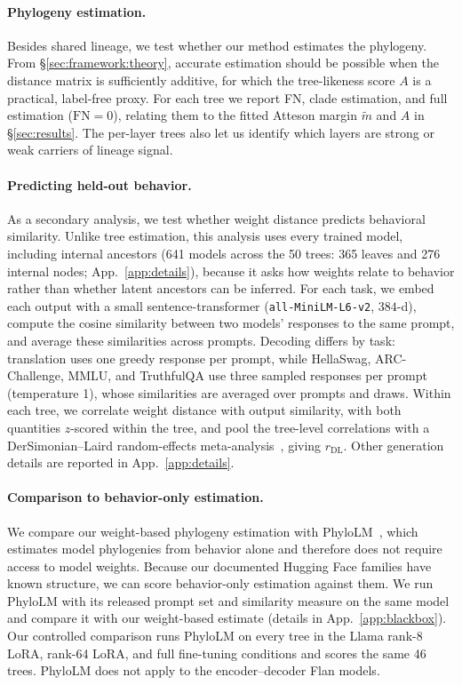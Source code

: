 \documentclass{article}
\theoremstyle{definition}
\theoremstyle{plain}
\begin{document}
\paragraph{Phylogeny estimation.}
\label{sec:exp:weights}
Besides shared lineage, we test whether our method estimates the phylogeny. From \S\ref{sec:framework:theory}, accurate estimation should be possible when the distance matrix is sufficiently additive, for which the tree-likeness score $A$ is a practical, label-free proxy. For each tree we report FN, clade estimation, and full estimation ($\mathrm{FN}=0$), relating them to the fitted Atteson margin $\widetilde m$ and $A$ in \S\ref{sec:results}. The per-layer trees also let us identify which layers are strong or weak carriers of lineage signal.


\paragraph{Predicting held-out behavior.}
\label{sec:exp:behavioral}
As a secondary analysis, we test whether weight distance predicts behavioral similarity. Unlike tree estimation, this analysis uses every trained model, including internal ancestors (641 models across the 50 trees: 365 leaves and 276 internal nodes; App.~\ref{app:details}), because it asks how weights relate to behavior rather than whether latent ancestors can be inferred. For each task, we embed each output with a small sentence-transformer (\texttt{all-MiniLM-L6-v2}, $384$-d), compute the cosine similarity between two models' responses to the same prompt, and average these similarities across prompts. Decoding differs by task: translation uses one greedy response per prompt, while HellaSwag, ARC-Challenge, MMLU, and TruthfulQA use three sampled responses per prompt (temperature 1), whose similarities are averaged over prompts and draws. Within each tree, we correlate weight distance with output similarity, with both quantities $z$-scored within the tree, and pool the tree-level correlations with a DerSimonian--Laird random-effects meta-analysis~\citep{dersimonianlaird1986}, giving $r_{\mathrm{DL}}$. Other generation details are reported in App.~\ref{app:details}.




\paragraph{Comparison to behavior-only estimation.}
\label{sec:exp:blackbox}
We compare our weight-based phylogeny estimation with PhyloLM~\citep{yax2025phylolm}, which estimates model phylogenies from behavior alone and therefore does not require access to model weights. Because our documented Hugging Face families have known structure, we can score behavior-only estimation against them. We run PhyloLM with its released prompt set and similarity measure on the same model and compare it with our weight-based estimate (details in App.~\ref{app:blackbox}). Our controlled comparison runs PhyloLM on every tree in the Llama rank-8 LoRA, rank-64 LoRA, and full fine-tuning conditions and scores the same 46 trees. PhyloLM does not apply to the encoder--decoder Flan models.
\end{document}
